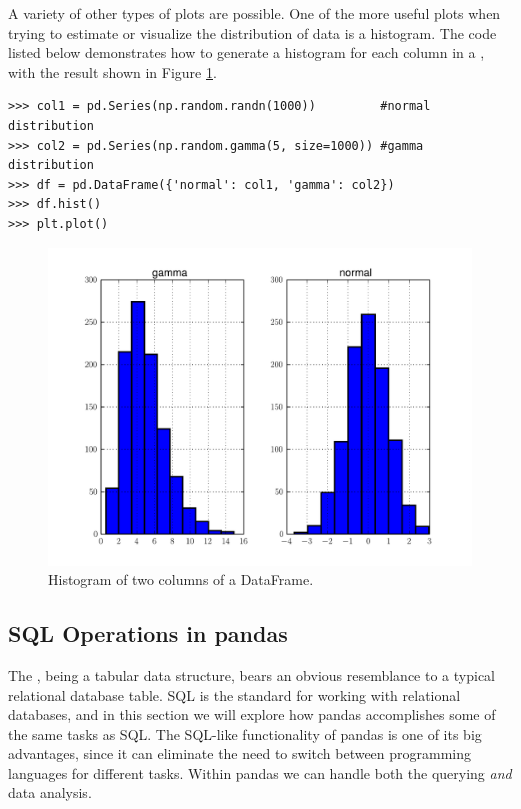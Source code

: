 A variety of other types of plots are possible. One of the more useful plots when trying to estimate or
visualize the distribution of data is a histogram. The code listed below demonstrates how to generate
a histogram for each column in a , with the result shown in Figure \ref{pandas:histogram}.

\begin{lstlisting}
>>> col1 = pd.Series(np.random.randn(1000))         #normal distribution
>>> col2 = pd.Series(np.random.gamma(5, size=1000)) #gamma distribution
>>> df = pd.DataFrame({'normal': col1, 'gamma': col2})
>>> df.hist()
>>> plt.plot()
\end{lstlisting}

\begin{figure}
\centering
\includegraphics[width=.7 \textwidth]{histogram.pdf}
\caption{Histogram of two columns of a DataFrame.}
\label{pandas:histogram}
\end{figure}

\subsection*{SQL Operations in pandas}
The , being a tabular data structure, bears an obvious resemblance to a typical relational
database table. SQL is the standard for working with relational databases, and in this section we will
explore how pandas accomplishes some of the same tasks as SQL. The SQL-like functionality of pandas is
one of its big advantages, since it can eliminate the need to switch between programming languages
for different tasks. Within pandas we can handle both the querying \emph{and} data analysis.

